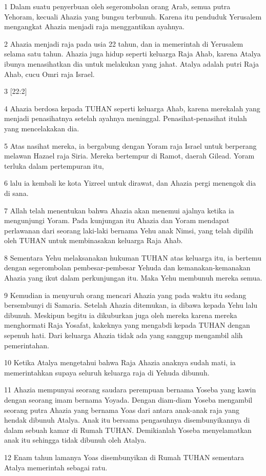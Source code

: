 \par 1 Dalam suatu penyerbuan oleh segerombolan orang Arab, semua putra Yehoram, kecuali Ahazia yang bungsu terbunuh. Karena itu penduduk Yerusalem mengangkat Ahazia menjadi raja menggantikan ayahnya.
\par 2 Ahazia menjadi raja pada usia 22 tahun, dan ia memerintah di Yerusalem selama satu tahun. Ahazia juga hidup seperti keluarga Raja Ahab, karena Atalya ibunya menasihatkan dia untuk melakukan yang jahat. Atalya adalah putri Raja Ahab, cucu Omri raja Israel.
\par 3 [22:2]
\par 4 Ahazia berdosa kepada TUHAN seperti keluarga Ahab, karena merekalah yang menjadi penasihatnya setelah ayahnya meninggal. Penasihat-penasihat itulah yang mencelakakan dia.
\par 5 Atas nasihat mereka, ia bergabung dengan Yoram raja Israel untuk berperang melawan Hazael raja Siria. Mereka bertempur di Ramot, daerah Gilead. Yoram terluka dalam pertempuran itu,
\par 6 lalu ia kembali ke kota Yizreel untuk dirawat, dan Ahazia pergi menengok dia di sana.
\par 7 Allah telah menentukan bahwa Ahazia akan menemui ajalnya ketika ia mengunjungi Yoram. Pada kunjungan itu Ahazia dan Yoram mendapat perlawanan dari seorang laki-laki bernama Yehu anak Nimsi, yang telah dipilih oleh TUHAN untuk membinasakan keluarga Raja Ahab.
\par 8 Sementara Yehu melaksanakan hukuman TUHAN atas keluarga itu, ia bertemu dengan segerombolan pembesar-pembesar Yehuda dan kemanakan-kemanakan Ahazia yang ikut dalam perkunjungan itu. Maka Yehu membunuh mereka semua.
\par 9 Kemudian ia menyuruh orang mencari Ahazia yang pada waktu itu sedang bersembunyi di Samaria. Setelah Ahazia ditemukan, ia dibawa kepada Yehu lalu dibunuh. Meskipun begitu ia dikuburkan juga oleh mereka karena mereka menghormati Raja Yosafat, kakeknya yang mengabdi kepada TUHAN dengan sepenuh hati. Dari keluarga Ahazia tidak ada yang sanggup mengambil alih pemerintahan.
\par 10 Ketika Atalya mengetahui bahwa Raja Ahazia anaknya sudah mati, ia memerintahkan supaya seluruh keluarga raja di Yehuda dibunuh.
\par 11 Ahazia mempunyai seorang saudara perempuan bernama Yoseba yang kawin dengan seorang imam bernama Yoyada. Dengan diam-diam Yoseba mengambil seorang putra Ahazia yang bernama Yoas dari antara anak-anak raja yang hendak dibunuh Atalya. Anak itu bersama pengasuhnya disembunyikannya di dalam sebuah kamar di Rumah TUHAN. Demikianlah Yoseba menyelamatkan anak itu sehingga tidak dibunuh oleh Atalya.
\par 12 Enam tahun lamanya Yoas disembunyikan di Rumah TUHAN sementara Atalya memerintah sebagai ratu.


